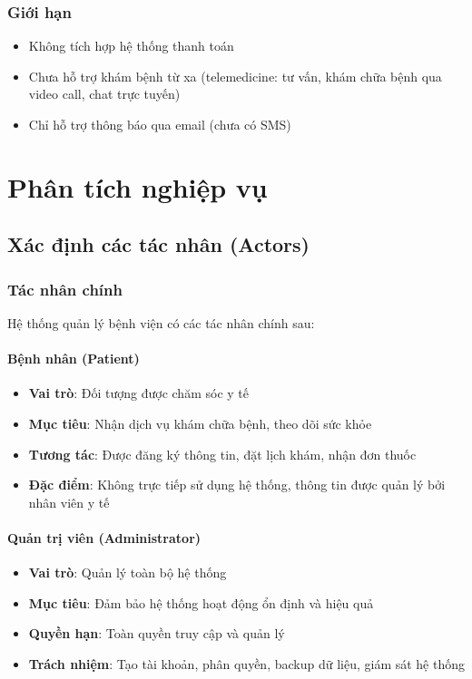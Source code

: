 \documentclass[12pt,a4paper]{report}
\begin{document}
\subsection{Giới hạn}
\begin{itemize}
    \item Không tích hợp hệ thống thanh toán
    \item Chưa hỗ trợ khám bệnh từ xa (telemedicine: tư vấn, khám chữa bệnh qua video call, chat trực tuyến)
    \item Chỉ hỗ trợ thông báo qua email (chưa có SMS)
\end{itemize}

\chapter{Phân tích nghiệp vụ}

\section{Xác định các tác nhân (Actors)}

\subsection{Tác nhân chính}
Hệ thống quản lý bệnh viện có các tác nhân chính sau:

\subsubsection{Bệnh nhân (Patient)}
\begin{itemize}
    \item \textbf{Vai trò}: Đối tượng được chăm sóc y tế
    \item \textbf{Mục tiêu}: Nhận dịch vụ khám chữa bệnh, theo dõi sức khỏe
    \item \textbf{Tương tác}: Được đăng ký thông tin, đặt lịch khám, nhận đơn thuốc
    \item \textbf{Đặc điểm}: Không trực tiếp sử dụng hệ thống, thông tin được quản lý bởi nhân viên y tế
\end{itemize}

\subsubsection{Quản trị viên (Administrator)}
\begin{itemize}
    \item \textbf{Vai trò}: Quản lý toàn bộ hệ thống
    \item \textbf{Mục tiêu}: Đảm bảo hệ thống hoạt động ổn định và hiệu quả
    \item \textbf{Quyền hạn}: Toàn quyền truy cập và quản lý
    \item \textbf{Trách nhiệm}: Tạo tài khoản, phân quyền, backup dữ liệu, giám sát hệ thống
\end{itemize}
\end{document}
